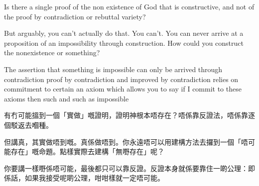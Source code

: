 Is there a single proof of the non existence of God that is constructive, and not of the proof by contradiction or rebuttal variety? 

But arguably, you can’t actually do that. You can’t. You can never arrive at a proposition of an impossibility through construction. How could you construct the nonexistence or something?  

The assertion that something is impossible can only be arrived through contradiction proof by contradiction and improved by contradiction relies on commitment to certain an axiom which allows you to say if I commit to these axioms then such and such as impossible   

有冇可能搵到一個「實做」嘅證明，證明神根本唔存在？唔係靠反證法，唔係靠逐個駁返去嗰種。

但講真，其實做唔到嘅。真係做唔到。你永遠唔可以用建構方法去攞到一個「唔可能存在」嘅命題。點樣實際去建構「無嘢存在」呢？

你要講一樣嘢係唔可能，最後都只可以靠反證。反證本身就係要靠住一啲公理：即係話，如果我接受呢啲公理，咁咁樣就一定唔可能。